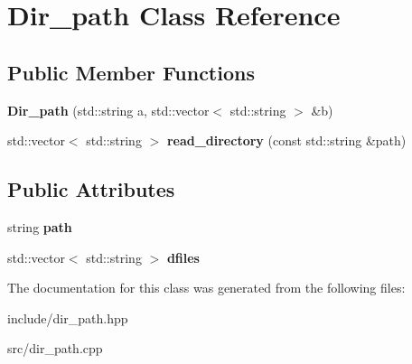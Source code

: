 \hypertarget{classDir__path}{}\section{Dir\+\_\+path Class Reference}
\label{classDir__path}
\subsection*{Public Member Functions}
\begin{DoxyCompactItemize}
\item 
\mbox{\label{classDir__path_a389587cf1df9ab733c69de1b84431dd7}} 
{\bfseries Dir\+\_\+path} (std\+::string a, std\+::vector$<$ std\+::string $>$ \&b)
\item 
\mbox{\label{classDir__path_a6d6230803a63286f7d2d01dda0fcca1a}} 
std\+::vector$<$ std\+::string $>$ {\bfseries read\+\_\+directory} (const std\+::string \&path)
\end{DoxyCompactItemize}
\subsection*{Public Attributes}
\begin{DoxyCompactItemize}
\item 
\mbox{\label{classDir__path_aefa5cad403c42a5597e98f36489cc196}} 
string {\bfseries path}
\item 
\mbox{\label{classDir__path_a194d00263fa61530b1fb023baf15f197}} 
std\+::vector$<$ std\+::string $>$ {\bfseries dfiles}
\end{DoxyCompactItemize}


The documentation for this class was generated from the following files\+:\begin{DoxyCompactItemize}
\item 
include/dir\+\_\+path.\+hpp\item 
src/dir\+\_\+path.\+cpp\end{DoxyCompactItemize}
